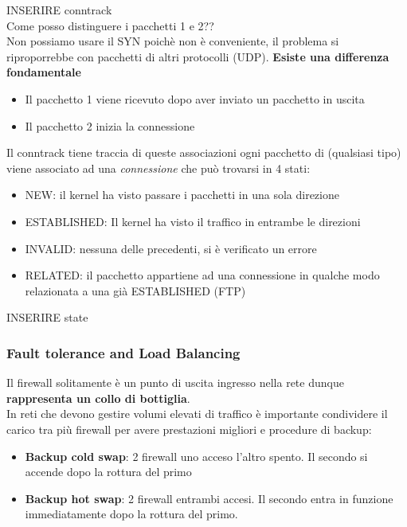 \documentclass[12pt]{article}
\begin{document}
				INSERIRE conntrack\\
				
				Come posso distinguere i pacchetti 1 e 2??\\
				Non possiamo usare il SYN poichè non è conveniente, il problema si riproporrebbe con pacchetti di altri protocolli (UDP). \textbf{Esiste una differenza fondamentale}
				\begin{itemize}
					\item Il pacchetto 1 viene ricevuto dopo aver inviato un pacchetto in uscita
					\item Il pacchetto 2 inizia la connessione
				\end{itemize}
				Il conntrack tiene traccia di queste associazioni ogni pacchetto di (qualsiasi tipo) viene associato ad una \textit{connessione} che può trovarsi in 4 stati:
				\begin{itemize}
					\item NEW: il kernel ha visto passare i pacchetti in una sola direzione
					\item ESTABLISHED: Il kernel ha visto il traffico in entrambe le direzioni
					\item INVALID: nessuna delle precedenti, si è verificato un errore
					\item RELATED: il pacchetto appartiene ad una connessione in qualche modo relazionata a una già ESTABLISHED (FTP)
				\end{itemize}
			
				INSERIRE state \\
				
			\subsubsection{Fault tolerance and Load Balancing  }
				Il firewall solitamente è un punto di uscita ingresso nella rete dunque \textbf{rappresenta un collo di bottiglia}.\\
				In reti che devono gestire volumi elevati di traffico è importante condividere il carico tra più firewall per avere prestazioni migliori e procedure di backup:
				\begin{itemize}
					\item \textbf{Backup cold swap}: 2 firewall uno acceso l'altro spento. Il secondo si accende dopo la rottura del primo
					\item \textbf{Backup hot swap}: 2 firewall entrambi accesi. Il secondo entra in funzione immediatamente dopo la rottura del primo.
				\end{itemize}
\end{document}
